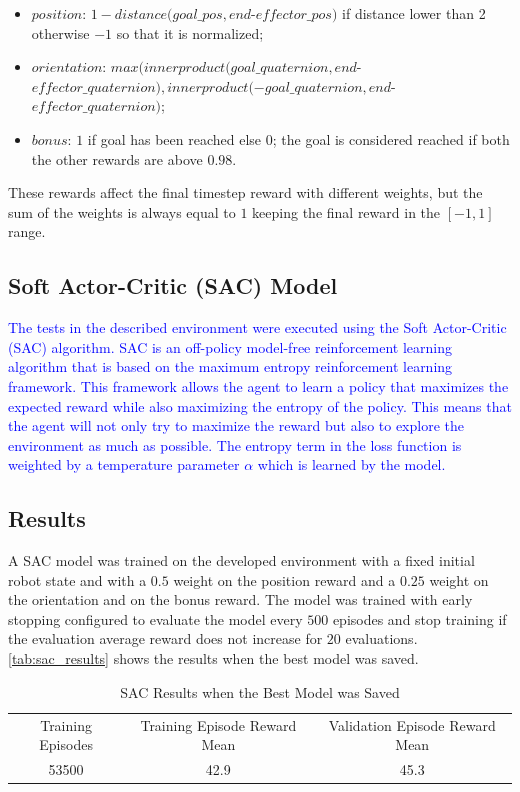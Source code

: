 \begin{itemize}
    \item $position$: $1-distance(goal\_pos, end$-$effector\_pos)$ if distance lower than 2 otherwise $-1$ so that it is normalized;
    \item $orientation$: $max(innerproduct(goal\_quaternion, end$-$effector\_quaternion), innerproduct(-goal\_quaternion, end$-$effector\_quaternion)$;
    \item $bonus$: $1$ if goal has been reached else $0$; the goal is considered reached if both the other rewards are above $0.98$.
\end{itemize}

These rewards affect the final timestep reward with different weights, but the sum of the weights is always equal to $1$ keeping the final reward in the $[-1, 1]$ range.

\subsection{Soft Actor-Critic (SAC) Model}

\textcolor{blue}{The tests in the described environment were executed using the Soft Actor-Critic (SAC) algorithm. SAC is an off-policy model-free reinforcement learning algorithm that is based on the maximum entropy reinforcement learning framework. This framework allows the agent to learn a policy that maximizes the expected reward while also maximizing the entropy of the policy. This means that the agent will not only try to maximize the reward but also to explore the environment as much as possible. The entropy term in the loss function is weighted by a temperature parameter $\alpha$ which is learned by the model.}

\subsection{Results}

A SAC model was trained on the developed environment with a fixed initial robot state and with a $0.5$ weight on the position reward and a $0.25$ weight on the orientation and on the bonus reward. The model was trained with early stopping configured to evaluate the model every $500$ episodes and stop training if the evaluation average reward does not increase for $20$ evaluations. \autoref{tab:sac_results} shows the results when the best model was saved.

\begin{table}[ht] 
\centering
\caption{SAC Results when the Best Model was Saved}
\label{tab:sac_results}
\begin{tabular}{ccc}
\toprule
\multirow{2}{0.25\textwidth}{\centering Training Episodes} & \multirow{2}{0.25\textwidth}{\centering Training Episode Reward Mean} & \multirow{2}{0.25\textwidth}{\centering Validation Episode Reward Mean} \\
& & \\
\midrule
53500 & 42.9 & 45.3\\
\bottomrule
\end{tabular}
\end{table}

